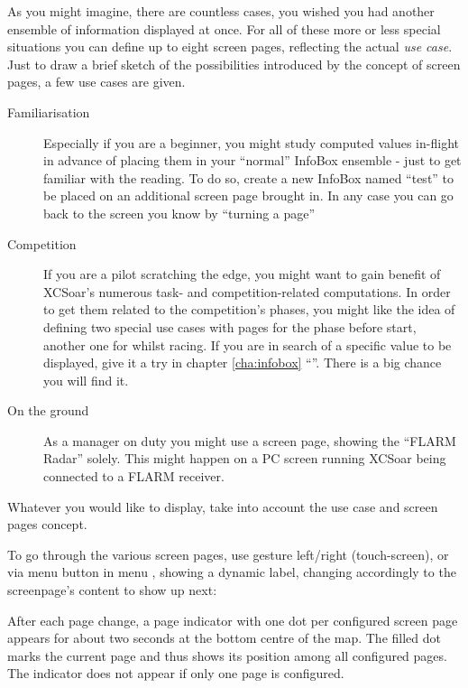 As you might imagine, there are countless cases, you wished you had another 
ensemble of information displayed at once.  For all of these more or less 
special situations you can define up to eight screen pages, reflecting the 
actual \emph{use case}. Just to draw a brief sketch of the possibilities 
introduced by the concept of screen pages, a few use cases are given. 
\label{par:use_case}
\begin{description}
\item[Familiarisation] Especially if you are a beginner, you might study 
computed values in-flight in advance of placing them in your ``normal'' InfoBox
ensemble - just to get familiar with the reading. To do so, create a new 
InfoBox named ``test'' to be placed on an additional screen page brought in. In
any case you can go back to the screen you know by ``turning a page''
\item[Competition] If you are a pilot scratching the edge, you might want to 
gain benefit of XCSoar's numerous task- and competition-related computations. 
In order to get them related to the competition's phases, you might like the 
idea of defining two special use cases with pages for the phase before start, 
another one for whilst racing.  If you are in search of a specific value to
be displayed, give it a try in chapter \ref{cha:infobox} ``''.
There is a big chance you will find it.
\item[On the ground] As a manager on duty you might use a screen page, showing 
the ``FLARM Radar'' solely.  This might happen on a PC screen running XCSoar
being connected to a FLARM receiver.
\end{description}

Whatever you would like to display, take into account the use case and screen 
pages concept.

To go through the various screen pages, use gesture left/right (touch-screen), or via menu button in menu , showing a dynamic label, changing accordingly to the screenpage's content to show up next:

\blink{}\blink{}\blink{}\blink{}

After each page change, a page indicator with one dot per configured
screen page appears for about two seconds at the bottom centre of the
map.  The filled dot marks the current page and thus shows its position
among all configured pages.  The indicator does not appear if only one
page is configured.


